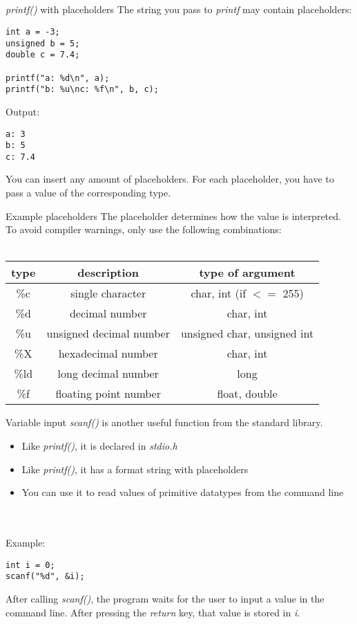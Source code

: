 \subsection{}
\begin{frame}[fragile]{\textit{printf()} with placeholders}
    The string you pass to \textit{printf} may contain placeholders:
    \begin{lstlisting}[numbers=none]
int a = -3;
unsigned b = 5;
double c = 7.4;

printf("a: %d\n", a);
printf("b: %u\nc: %f\n", b, c);
\end{lstlisting}
Output:\begin{lstlisting}[numbers=none]
a: 3
b: 5
c: 7.4
\end{lstlisting}
You can insert any amount of placeholders. For each placeholder, you have to pass a value of the corresponding type.
\end{frame}
\begin{frame}{Example placeholders}
    The placeholder determines how the value is interpreted.
    To avoid compiler warnings, only use the following combinations: \\ \ \\
    \centering
    \renewcommand{\arraystretch}{1.5}
    \begin{tabular}{|c|c|c|}
        \hline
        \textbf{type} & \textbf{description} & \textbf{type of argument} \\\hline
        \%c & single character & char, int (if $<=$ 255) \\\hline
        \%d & decimal number & char, int \\\hline
        \%u & unsigned decimal number & unsigned char, unsigned int \\\hline
        \%X & hexadecimal number & char, int \\\hline
        \%ld & long decimal number & long \\\hline
        \%f & floating point number & float, double \\\hline
    \end{tabular}
\end{frame}
\begin{frame}[fragile]{Variable input}
    \textit{scanf()} is another useful function from the standard library.
    \begin{itemize}
        \item Like \textit{printf()}, it is declared in \textit{stdio.h}
        \item Like \textit{printf()}, it has a format string with placeholders
        \item You can use it to read values of primitive datatypes from the command line
    \end{itemize}
    \ \\ \ \\ Example:
    \begin{lstlisting}[numbers=none]
int i = 0;
scanf("%d", &i);	
\end{lstlisting}
    After calling \textit{scanf()}, the program waits for the user to input a value in the command line.
    After pressing the \textit{return} key, that value is stored in \textit{i}.
\end{frame}
